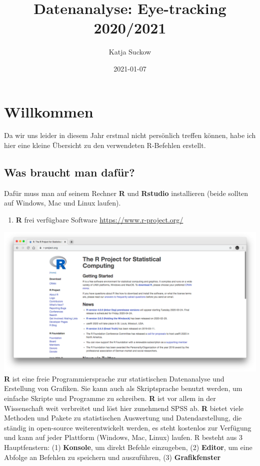 \documentclass[]{book}
\title{Datenanalyse: Eye-tracking 2020/2021}
\author{Katja Suckow}
\date{2021-01-07}
\providecommand{\tightlist}{%
  \setlength{\itemsep}{0pt}\setlength{\parskip}{0pt}}
\begin{document}
\maketitle

{
\setcounter{tocdepth}{1}
\tableofcontents
}
\chapter{Willkommen}\label{willkommen}

Da wir uns leider in diesem Jahr erstmal nicht persönlich treffen
können, habe ich hier eine kleine Übersicht zu den verwendeten
R-Befehlen erstellt.

\section{Was braucht man dafür?}\label{was-braucht-man-dafuxfcr}

Dafür muss man auf seinem Rechner \textbf{R} und \textbf{Rstudio}
installieren (beide sollten auf Windows, Mac und Linux laufen).

\begin{enumerate}
\def\labelenumi{\arabic{enumi}.}
\tightlist
\item
  \textbf{R} frei verfügbare Software \url{https://www.r-project.org/}
\end{enumerate}

\includegraphics{./img/Rdownload.png} \textbf{R} ist eine freie
Programmiersprache zur statistischen Datenanalyse und Erstellung von
Grafiken. Sie kann auch als Skriptsprache benutzt werden, um einfache
Skripte und Programme zu schreiben. \textbf{R} ist vor allem in der
Wissenschaft weit verbreitet und löst hier zunehmend SPSS ab. \textbf{R}
bietet viele Methoden und Pakete zu statistischen Auswertung und
Datendarstellung, die ständig in open-source weiterentwickelt werden, es
steht kostenlos zur Verfügung und kann auf jeder Plattform (Windows,
Mac, Linux) laufen. R besteht aus 3 Hauptfenstern: (1) \textbf{Konsole},
um direkt Befehle einzugeben, (2) \textbf{Editor}, um eine Abfolge an
Befehlen zu speichern und auszuführen, (3) \textbf{Grafikfenster}
\end{document}
